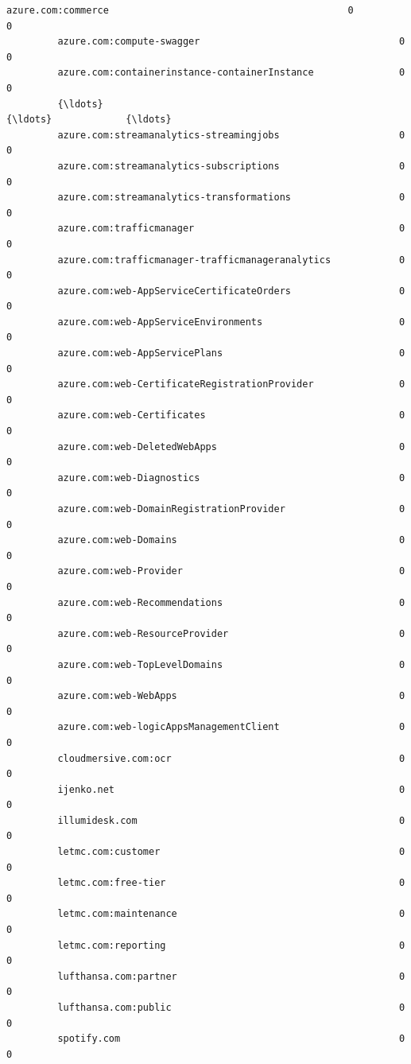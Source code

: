 \documentclass[11pt]{article}
\begin{document}
\begin{Verbatim}[commandchars=\\\{\}]
         azure.com:commerce                                          0               0   
         azure.com:compute-swagger                                   0               0   
         azure.com:containerinstance-containerInstance               0               0   
         {\ldots}                                                       {\ldots}             {\ldots}   
         azure.com:streamanalytics-streamingjobs                     0               0   
         azure.com:streamanalytics-subscriptions                     0               0   
         azure.com:streamanalytics-transformations                   0               0   
         azure.com:trafficmanager                                    0               0   
         azure.com:trafficmanager-trafficmanageranalytics            0               0   
         azure.com:web-AppServiceCertificateOrders                   0               0   
         azure.com:web-AppServiceEnvironments                        0               0   
         azure.com:web-AppServicePlans                               0               0   
         azure.com:web-CertificateRegistrationProvider               0               0   
         azure.com:web-Certificates                                  0               0   
         azure.com:web-DeletedWebApps                                0               0   
         azure.com:web-Diagnostics                                   0               0   
         azure.com:web-DomainRegistrationProvider                    0               0   
         azure.com:web-Domains                                       0               0   
         azure.com:web-Provider                                      0               0   
         azure.com:web-Recommendations                               0               0   
         azure.com:web-ResourceProvider                              0               0   
         azure.com:web-TopLevelDomains                               0               0   
         azure.com:web-WebApps                                       0               0   
         azure.com:web-logicAppsManagementClient                     0               0   
         cloudmersive.com:ocr                                        0               0   
         ijenko.net                                                  0               0   
         illumidesk.com                                              0               0   
         letmc.com:customer                                          0               0   
         letmc.com:free-tier                                         0               0   
         letmc.com:maintenance                                       0               0   
         letmc.com:reporting                                         0               0   
         lufthansa.com:partner                                       0               0   
         lufthansa.com:public                                        0               0   
         spotify.com                                                 0               0   
         

\end{Verbatim}
\end{document}
